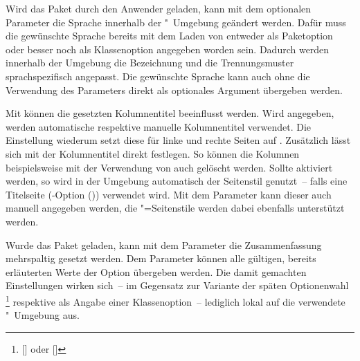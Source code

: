 \begin{DeclareEntity*}{}
\begin{DeclareEntity*}{}
\begin{DeclareEntity*}{}
\begin{Declaration}
\begin{Declaration}
\begin{Declaration}
\begin{Declaration}
\begin{Declaration}
\begin{Declaration}
\begin{Declaration}
%
Wird das Paket  durch den Anwender geladen, kann mit dem 
optionalen Parameter  die 
Sprache innerhalb der "~Umgebung geändert werden. Dafür 
muss die gewünschte Sprache bereits mit dem Laden von  entweder 
als Paketoption oder besser noch als Klassenoption angegeben worden sein. 
Dadurch werden innerhalb der Umgebung die Bezeichnung  und 
die Trennungsmuster sprachspezifisch angepasst. Die gewünschte Sprache kann 
auch ohne die Verwendung des Parameters  
direkt als optionales Argument übergeben werden.

%
%
Mit  können die gesetzten Kolumnentitel 
beeinflusst werden. Wird  angegeben, werden automatische respektive manuelle Kolumnentitel verwendet. 
Die Einstellung  
wiederum setzt diese für linke und rechte Seiten auf . 
Zusätzlich lässt sich mit  der Kolumnentitel direkt festlegen. So können die Kolumnen beispielsweise mit 
der Verwendung von  auch 
gelöscht werden. Sollte  aktiviert 
werden, so wird in der Umgebung automatisch der Seitenstil  
genutzt~-- falls eine Titelseite
(\KOMAScript-Option ()) verwendet 
wird. Mit dem Parameter  kann dieser 
auch manuell angegeben werden, die "=Seitenstile 
werden dabei ebenfalls unterstützt werden.

%
Wurde das Paket  geladen, kann mit dem Parameter 
 die Zusammenfassung 
mehrspaltig gesetzt werden. Dem Parameter  
können alle gültigen, bereits erläuterten Werte der Option  
übergeben werden. Die damit gemachten Einstellungen wirken sich~-- im Gegensatz 
zur Variante der späten Optionenwahl%
\footnote{%
  [] oder
  []%
}
respektive als Angabe einer Klassenoption~-- lediglich lokal auf die verwendete 
"~Umgebung aus.


\end{Declaration}
\end{Declaration}
\end{Declaration}
\end{Declaration}
\end{Declaration}
\end{Declaration}
\end{Declaration}
\end{DeclareEntity*}
\end{DeclareEntity*}
\end{DeclareEntity*}
